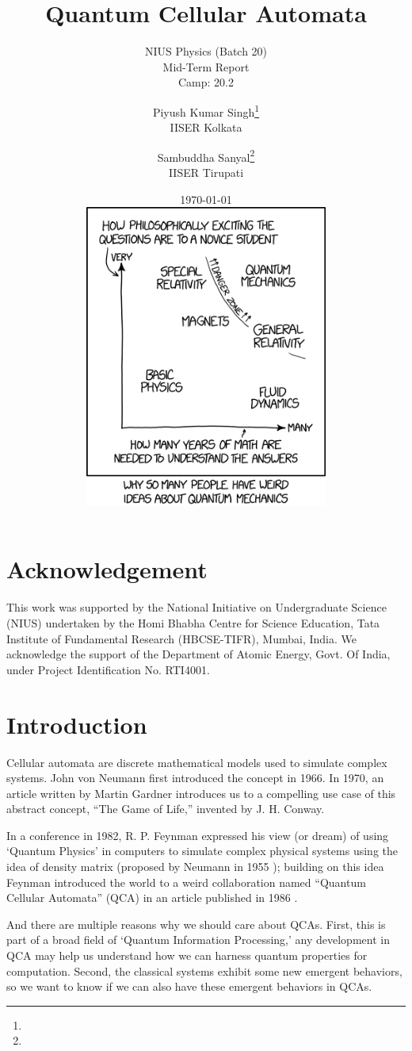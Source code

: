 \documentclass[11pt, oneside]{scrbook}
\title{Quantum Cellular Automata}
\subtitle{NIUS Physics (Batch 20) \\ Mid-Term Report \\ Camp: 20.2}
\author{
    Piyush Kumar Singh\thanks{\mailto{pks22ms027@iiserkol.ac.in}} \\ {\large IISER Kolkata} 
    \and
    Sambuddha Sanyal\thanks{\mailto{sambuddha.sanyal@iisertirupati.ac.in}} \\ {\large IISER Tirupati}
}
\date{
    \today \\
    \vspace{5ex}
    \includegraphics[width = 0.6\textwidth]{quantum-xkcd.png}
}
\begin{document}
\frontmatter
\begin{titlepage}
    \let\newpage\relax%
    \singhtitle
\end{titlepage}

\chapter*{Acknowledgement}

{\large\noindent
    This work was supported by the National Initiative on Undergraduate Science (NIUS) undertaken
    by the Homi Bhabha Centre for Science Education, Tata Institute of Fundamental Research
    (HBCSE-TIFR), Mumbai, India. We acknowledge the support of the Department of Atomic
    Energy, Govt. Of India, under Project Identification No. RTI4001.}

\tableofcontents

\mainmatter

\chapter{Introduction}


Cellular automata are discrete mathematical models used to simulate complex systems. John von Neumann first introduced the concept \cite{Neumann1966} in 1966. In 1970, an article written by Martin Gardner \cite{Gardner1970} introduces us to a compelling use case of this abstract concept, ``The Game of Life,'' invented by J. H. Conway.


In a conference in 1982, R. P. Feynman expressed his view (or dream) of using `Quantum Physics' in computers \cite{Feynman1982} to simulate complex physical systems using the idea of density matrix (proposed by Neumann in 1955 \cite{Neumann2018}); building on this idea Feynman introduced the world to a weird collaboration named ``Quantum Cellular Automata'' (QCA) in an article published in 1986 \cite{Feynman1986}.

And there are multiple reasons why we should care about QCAs. First, this is part of a broad field of `Quantum Information Processing,' any development in QCA may help us understand how we can harness quantum properties for computation. Second, the classical systems exhibit some new emergent behaviors, so we want to know if we can also have these emergent behaviors in QCAs.
\end{document}
